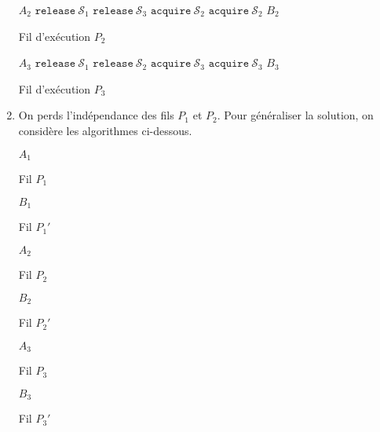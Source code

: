 \begin{enumerate}
\begin{multicols}{3}
\begin{algorithm}[H]
\begin{algorithmic}[1]
					\State $A_2$
					\State $\texttt{release}\ \mathcal{S}_1$
					\State $\texttt{release}\ \mathcal{S}_3$
					\State $\texttt{acquire}\ \mathcal{S}_2$
					\State $\texttt{acquire}\ \mathcal{S}_2$
					\State $B_2$
				\end{algorithmic}
				\caption{Fil d'exécution $P_2$}
			\end{algorithm}
			\begin{algorithm}[H]
				\centering
				\begin{algorithmic}[1]
					\State $A_3$
					\State $\texttt{release}\ \mathcal{S}_1$
					\State $\texttt{release}\ \mathcal{S}_2$
					\State $\texttt{acquire}\ \mathcal{S}_3$
					\State $\texttt{acquire}\ \mathcal{S}_3$
					\State $B_3$
				\end{algorithmic}
				\caption{Fil d'exécution $P_3$}
			\end{algorithm}
		\end{multicols}
	\item
		On perds l'indépendance des fils $P_1$ et $P_2$.
		Pour généraliser la solution, on considère les algorithmes ci-dessous.

		\begin{multicols}{3}
			\begin{algorithm}[H]
				\centering
				\begin{algorithmic}[1]
					\State $A_1$
				\end{algorithmic}
				\caption{Fil $P_1$}
			\end{algorithm}
			\begin{algorithm}[H]
				\centering
				\begin{algorithmic}[1]
					\State $B_1$
				\end{algorithmic}
				\caption{Fil $P_1'$}
			\end{algorithm}
			\begin{algorithm}[H]
				\centering
				\begin{algorithmic}[1]
					\State $A_2$
				\end{algorithmic}
				\caption{Fil $P_2$}
			\end{algorithm}
			\begin{algorithm}[H]
				\centering
				\begin{algorithmic}[1]
					\State $B_2$
				\end{algorithmic}
				\caption{Fil $P_2'$}
			\end{algorithm}
			\begin{algorithm}[H]
				\centering
				\begin{algorithmic}[1]
					\State $A_3$
				\end{algorithmic}
				\caption{Fil $P_3$}
			\end{algorithm}
			\begin{algorithm}[H]
				\centering
				\begin{algorithmic}[1]
					\State $B_3$
				\end{algorithmic}
				\caption{Fil $P_3'$}
			\end{algorithm}
		\end{multicols}


\end{enumerate}
